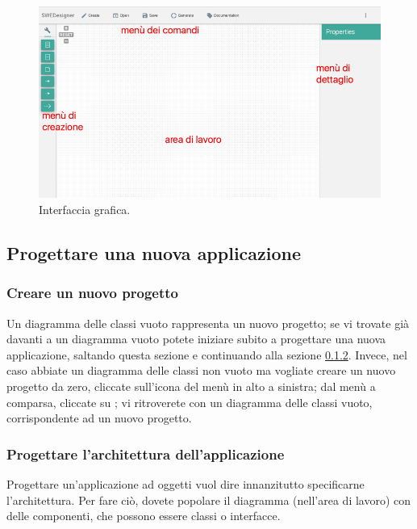 \begin{figure}[h]
\centering
	\includegraphics[scale=0.46]{img/index}
	\caption{Interfaccia grafica.}
	\label{fig:screen}
\end{figure}



\subsection{Progettare una nuova applicazione} \label{sec:new}

\subsubsection{Creare un nuovo progetto}
Un diagramma delle classi vuoto rappresenta un nuovo progetto; se vi trovate già davanti a un diagramma vuoto potete iniziare subito a progettare una nuova applicazione, saltando questa sezione e continuando alla sezione \ref{par:arch}. Invece, nel caso abbiate un diagramma delle classi non vuoto ma vogliate creare un nuovo progetto da zero, cliccate sull'icona del menù in alto a sinistra; dal menù a comparsa, cliccate su ; vi ritroverete con un diagramma delle classi vuoto, corrispondente ad un nuovo progetto.

\subsubsection{Progettare l'architettura dell'applicazione} \label{par:arch}
Progettare un'applicazione ad oggetti vuol dire innanzitutto specificarne l'architettura. Per fare ciò, dovete popolare il diagramma (nell'area di lavoro) con delle componenti, che possono essere classi o interfacce.

